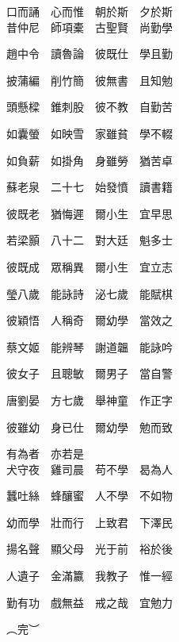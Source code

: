\documentclass[a4paper,twocolumn]{article}
\begin{document}
\begin{Large}
口而誦　心而惟　朝於斯　夕於斯　
\\

昔仲尼　師項橐　古聖賢　尚勤學　

趙中令　讀魯論　彼既仕　學且勤　

披蒲編　削竹簡　彼無書　且知勉　

頭懸樑　錐刺股　彼不教　自勤苦　

如囊螢　如映雪　家雖貧　學不輟　

如負薪　如掛角　身雖勞　猶苦卓　

蘇老泉　二十七　始發憤　讀書籍　

彼既老　猶悔遲　爾小生　宜早思　

若梁顥　八十二　對大廷　魁多士　

彼既成　眾稱異　爾小生　宜立志　

瑩八歲　能詠詩　泌七歲　能賦棋　

彼穎悟　人稱奇　爾幼學　當效之　

蔡文姬　能辨琴　謝道韞　能詠吟　

彼女子　且聰敏　爾男子　當自警　

唐劉晏　方七歲　舉神童　作正字　

彼雖幼　身已仕　爾幼學　勉而致　

有為者　亦若是　
\\

犬守夜　雞司晨　苟不學　曷為人　

蠶吐絲　蜂釀蜜　人不學　不如物　

幼而學　壯而行　上致君　下澤民　

揚名聲　顯父母　光于前　裕於後　

人遺子　金滿籝　我教子　惟一經　

勤有功　戲無益　戒之哉　宜勉力　

︵完︶

\end{Large}
\end{document}
